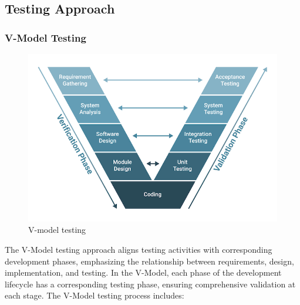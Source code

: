 		
	\subsection{Testing Approach}

		\subsubsection{V-Model Testing}

		\begin{figure}[H]
			\centering
			\includegraphics[width=0.55\linewidth]{images/v-model-testing.png}
			\caption{V-model testing}
			\label{fig:v-model-testing}
		\end{figure}

		The V-Model testing approach aligns testing activities with corresponding development phases, emphasizing the relationship between requirements, design, implementation, and testing. In the V-Model, each phase of the development lifecycle has a corresponding testing phase, ensuring comprehensive validation at each stage. The V-Model testing process includes:

